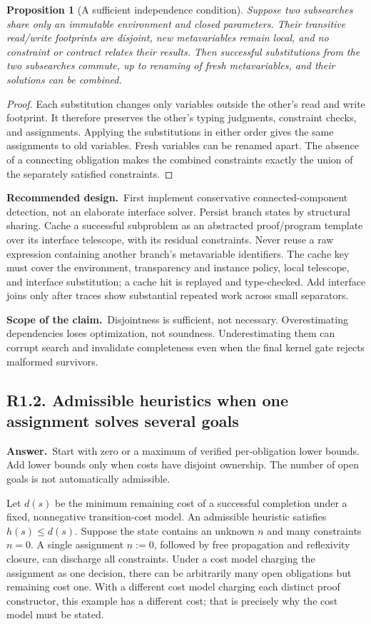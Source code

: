 \documentclass[11pt,a4paper]{article}
\newcommand{\qid}[3]{\subsection{#2. #3}\label{#1}}
\newcommand{\answer}{\noindent\textbf{Answer.}\ }
\newcommand{\proposal}{\noindent\textbf{Recommended design.}\ }
\newcommand{\scope}{\noindent\textbf{Scope of the claim.}\ }
\newtheorem{proposition}{Proposition}[section]
\theoremstyle{remark}
\begin{document}
\begin{proposition}[A sufficient independence condition]
Suppose two subsearches share only an immutable environment and closed parameters. Their transitive read/write footprints are disjoint, new metavariables remain local, and no constraint or contract relates their results. Then successful substitutions from the two subsearches commute, up to renaming of fresh metavariables, and their solutions can be combined.
\end{proposition}
\begin{proof}
Each substitution changes only variables outside the other's read and write footprint. It therefore preserves the other's typing judgments, constraint checks, and assignments. Applying the substitutions in either order gives the same assignments to old variables. Fresh variables can be renamed apart. The absence of a connecting obligation makes the combined constraints exactly the union of the separately satisfied constraints.
\end{proof}

\proposal First implement conservative connected-component detection, not an elaborate interface solver. Persist branch states by structural sharing. Cache a successful subproblem as an abstracted proof/program template over its interface telescope, with its residual constraints. Never reuse a raw expression containing another branch's metavariable identifiers. The cache key must cover the environment, transparency and instance policy, local telescope, and interface substitution; a cache hit is replayed and type-checked. Add interface joins only after traces show substantial repeated work across small separators.

\scope Disjointness is sufficient, not necessary. Overestimating dependencies loses optimization, not soundness. Underestimating them can corrupt search and invalidate completeness even when the final kernel gate rejects malformed survivors.

\qid{q12}{R1.2}{Admissible heuristics when one assignment solves several goals}
\answer Start with zero or a maximum of verified per-obligation lower bounds. Add lower bounds only when costs have disjoint ownership. The number of open goals is not automatically admissible.

Let $d(s)$ be the minimum remaining cost of a successful completion under a fixed, nonnegative transition-cost model. An admissible heuristic satisfies $h(s)\leq d(s)$. Suppose the state contains an unknown $n$ and many constraints $n=0$. A single assignment $n:=0$, followed by free propagation and reflexivity closure, can discharge all constraints. Under a cost model charging the assignment as one decision, there can be arbitrarily many open obligations but remaining cost one. With a different cost model charging each distinct proof constructor, this example has a different cost; that is precisely why the cost model must be stated.
\end{document}
